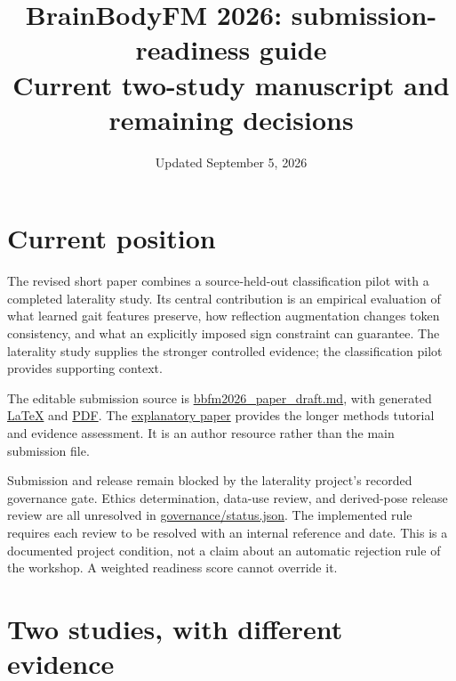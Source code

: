 \documentclass[11pt,letterpaper]{article}
\title{\LARGE BrainBodyFM 2026: submission-readiness
guide\\[0.45em]\large Current two-study manuscript and remaining
decisions}
\author{}
\date{\small Updated September 5, 2026}
\begin{document}
\maketitle
\section{Current position}\label{current-position}

The revised short paper combines a source-held-out classification pilot
with a completed laterality study. Its central contribution is an
empirical evaluation of what learned gait features preserve, how
reflection augmentation changes token consistency, and what an
explicitly imposed sign constraint can guarantee. The laterality study
supplies the stronger controlled evidence; the classification pilot
provides supporting context.

The editable submission source is \url{bbfm2026_paper_draft.md}, with
generated \href{bbfm2026_paper_draft.tex}{LaTeX} and
\href{bbfm2026_paper_draft.pdf}{PDF}. The
\href{explanatory_paper.pdf}{explanatory paper} provides the longer
methods tutorial and evidence assessment. It is an author resource
rather than the main submission file.

Submission and release remain blocked by the laterality project's
recorded governance gate. Ethics determination, data-use review, and
derived-pose release review are all unresolved in
\href{../../neurips-laterality/governance/status.json}{governance/status.json}.
The implemented rule requires each review to be resolved with an
internal reference and date. This is a documented project condition, not
a claim about an automatic rejection rule of the workshop. A weighted
readiness score cannot override it.

\section{Two studies, with different
evidence}\label{two-studies-with-different-evidence}
\end{document}
